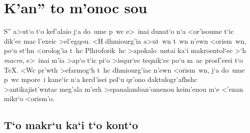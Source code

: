 \section{K'an'' to m'onoc sou}
      
S'' a>ut`o t`o kef'alaio j`a do~ume p~wc e>~inai dunat`o n`a <or'isoume
t`ic dik'ec mac l'exeic >el'egqou.  <H dhmiourg'ia a>ut~wn t~wn n'ewn
{\tengs <orism~wn\/}, po`u st`hn <orolog'ia t~hc Plhroforik~hc
>apokalo~untai ka`i {\tengs makroentol`ec\/} >`h {\sl macro}, e>~inai
m'ia >ap`o t`ic pi`o >isqur`ec teqnik`ec po`u m~ac prosf'erei t`o
{\rm\TeX}\null. <Wc pr'wth >efarmog`h t~hc dhmiourg'iac n'ewn <orism~wn,
j`a do~ume p~wc mpore~i kane`ic n`a kerd'isei pol`u qr'ono
daktulogr'afhshc >antikajist'wntac meg'ala m'erh >epanalamban'omenou
keim'enou m`e <'enan mikr`o <orism'o.

\subsection{T`o makr`u ka`i t`o kont`o}

